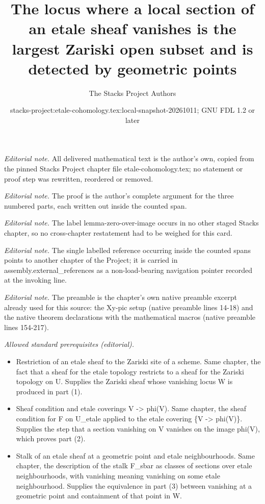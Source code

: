 \documentclass[10pt,a4paper]{amsart}
\title{The locus where a local section of an etale sheaf vanishes is the largest Zariski open subset and is detected by geometric points}
\author{The Stacks Project Authors}
\date{stacks-project:etale-cohomology.tex:local-snapshot-20261011; GNU FDL 1.2 or later}
\theoremstyle{plain}
\theoremstyle{definition}
\theoremstyle{remark}
\numberwithin{equation}{subsection}
\begin{document}
\maketitle
\noindent\textit{Editorial note.} All delivered mathematical text is the author's own, copied from the pinned Stacks Project chapter file etale-cohomology.tex; no statement or proof step was rewritten, reordered or removed.\par\medskip
\noindent\textit{Editorial note.} The proof is the author's complete argument for the three numbered parts, each written out inside the counted span.\par\medskip
\noindent\textit{Editorial note.} The label lemma-zero-over-image occurs in no other staged Stacks chapter, so no cross-chapter restatement had to be weighed for this card.\par\medskip
\noindent\textit{Editorial note.} The single labelled reference occurring inside the counted spans points to another chapter of the Project; it is carried in assembly.external\_references as a non-load-bearing navigation pointer recorded at the invoking line.\par\medskip
\noindent\textit{Editorial note.} The preamble is the chapter's own native preamble excerpt already used for this source: the Xy-pic setup (native preamble lines 14-18) and the native theorem declarations with the mathematical macros (native preamble lines 154-217).\par\medskip
\noindent\textit{Allowed standard prerequisites (editorial).}\begin{itemize}
\item Restriction of an etale sheaf to the Zariski site of a scheme. Same chapter, the fact that a sheaf for the etale topology restricts to a sheaf for the Zariski topology on U. Supplies the Zariski sheaf whose vanishing locus W is produced in part (1).
\item Sheaf condition and etale coverings V -> phi(V). Same chapter, the sheaf condition for F on U\_etale applied to the etale covering \{V -> phi(V)\}. Supplies the step that a section vanishing on V vanishes on the image phi(V), which proves part (2).
\item Stalk of an etale sheaf at a geometric point and etale neighbourhoods. Same chapter, the description of the stalk F\_sbar as classes of sections over etale neighbourhoods, with vanishing meaning vanishing on some etale neighbourhood. Supplies the equivalence in part (3) between vanishing at a geometric point and containment of that point in W.
\end{itemize}\medskip
\end{document}

